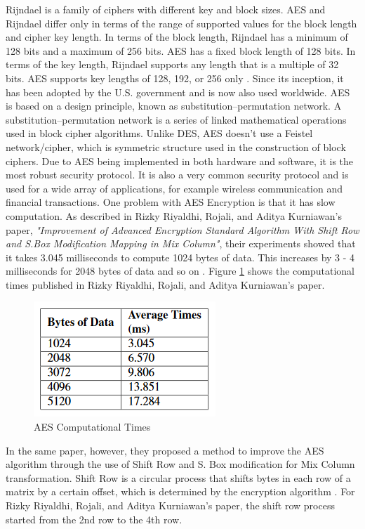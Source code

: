 \documentclass[journal]{IEEEtran}
\begin{document}
Rijndael is a family of ciphers with different key and block sizes. AES and Rijndael differ only in terms of the range of supported values for the block length and cipher key length. In terms of the block length, Rijndael has a minimum of 128 bits and a maximum of 256 bits. AES has a fixed block length of 128 bits. In terms of the key length, Rijndael supports any length that is a multiple of 32 bits. AES supports key lengths of 128, 192, or 256 only \cite{aes_rijndael_length}. Since its inception, it has been adopted by the U.S. government and is now also used worldwide. AES is based on a design principle, known as substitution–permutation network. A substitution–permutation network is a series of linked mathematical operations used in block cipher algorithms. Unlike DES, AES doesn't use a Feistel network/cipher, which is symmetric structure used in the construction of block ciphers. Due to AES being implemented in both hardware and software, it is the most robust security protocol. It is also a very common security protocol and is used for a wide array of applications, for example wireless communication and financial transactions. One problem with AES Encryption is that it has slow computation. As described in Rizky Riyaldhi, Rojali, and Aditya Kurniawan's paper, \textit{"Improvement of Advanced Encryption Standard Algorithm With Shift Row and S.Box Modification Mapping in Mix Column"}, their experiments showed that it takes 3.045 milliseconds to compute 1024 bytes of data. This increases by 3 - 4 milliseconds for 2048 bytes of data and so on \cite{aes_improvement}. Figure \ref{fig:aes_times} shows the computational times published in Rizky Riyaldhi, Rojali, and Aditya Kurniawan's paper.

\newline
\begin{figure}[!h]
    \centering
    \includegraphics[scale=.7]{aes_times}
    \caption{AES Computational Times}
    \label{fig:aes_times}
\end{figure}

In the same paper, however, they proposed a method to improve the AES algorithm through the use of Shift Row and S. Box modification for Mix Column transformation. Shift Row is a circular process that shifts bytes in each row of a matrix by a certain offset, which is determined by the encryption algorithm \cite{shift_row}. For Rizky Riyaldhi, Rojali, and Aditya Kurniawan's paper, the shift row process started from the 2nd row to the 4th row. 
\end{document}

